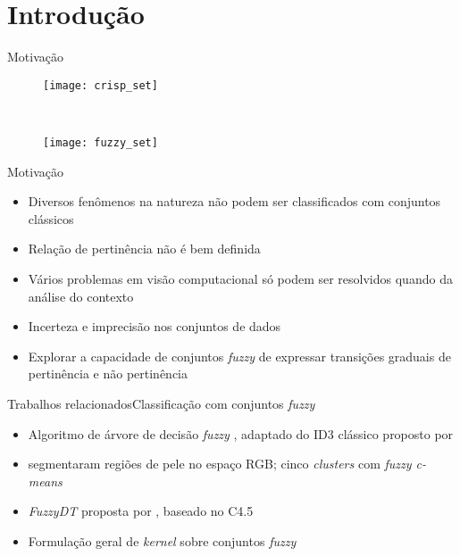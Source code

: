 \section{Introdução}

\begin{frame}{Motivação}
\begin{figure}[h]
    \centering
    \begin{minipage}{0.48\textwidth}
        \texttt{[image: crisp\_set]}
    \end{minipage}
    ~ %
    \begin{minipage}{0.48\textwidth}
        \texttt{[image: fuzzy\_set]}
    \end{minipage}
\end{figure}
\end{frame}

\begin{frame}{Motivação}
\begin{itemize}
    \item Diversos fenômenos na natureza não podem ser classificados com conjuntos clássicos
    \item Relação de pertinência não é bem definida
    \item Vários problemas em visão computacional só podem ser resolvidos quando da análise do contexto
    \item Incerteza e imprecisão nos conjuntos de dados
    \item Explorar a capacidade de conjuntos \emph{fuzzy} de expressar transições graduais de pertinência e não pertinência
\end{itemize}
\end{frame}

\begin{frame}{Trabalhos relacionados}{Classificação com conjuntos \emph{fuzzy}}
\begin{itemize}
    \item Algoritmo de árvore de decisão \emph{fuzzy} \citep{umano:94}, adaptado do ID3 clássico proposto por \citet{quinlan:86}
    \item \citet{bhatt:09} segmentaram regiões de pele no espaço RGB; cinco \emph{clusters} com \emph{fuzzy c-means} \citep{bezdek:84}
    \item \emph{FuzzyDT} proposta por \citet{cintra:13}, baseado no C4.5 \citep{quinlan:93}
    \item Formulação geral de \emph{kernel} sobre conjuntos \emph{fuzzy} \citep{guevara:14}
\end{itemize}
\end{frame}

